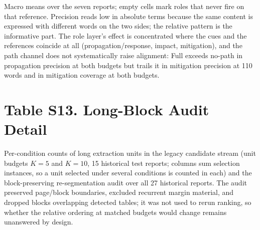 \documentclass[11pt]{article}
\begin{document}
\begin{center}
\small
{}
\end{center}

Macro means over the seven reports; empty cells mark roles that never fire on that reference. Precision reads low in absolute terms because the same content is expressed with different words on the two sides; the relative pattern is the informative part. The role layer's effect is concentrated where the cues and the references coincide at all (propagation/response, impact, mitigation), and the path channel does not systematically raise alignment: Full exceeds no-path in propagation precision at both budgets but trails it in mitigation precision at 110 words and in mitigation coverage at both budgets.

\section*{Table S13. Long-Block Audit Detail}

Per-condition counts of long extraction units in the legacy candidate stream (unit budgets $K{=}5$ and $K{=}10$, 15 historical test reports; columns sum selection instances, so a unit selected under several conditions is counted in each) and the block-preserving re-segmentation audit over all 27 historical reports. The audit preserved page/block boundaries, excluded recurrent margin material, and dropped blocks overlapping detected tables; it was not used to rerun ranking, so whether the relative ordering at matched budgets would change remains unanswered by design.
\end{document}

